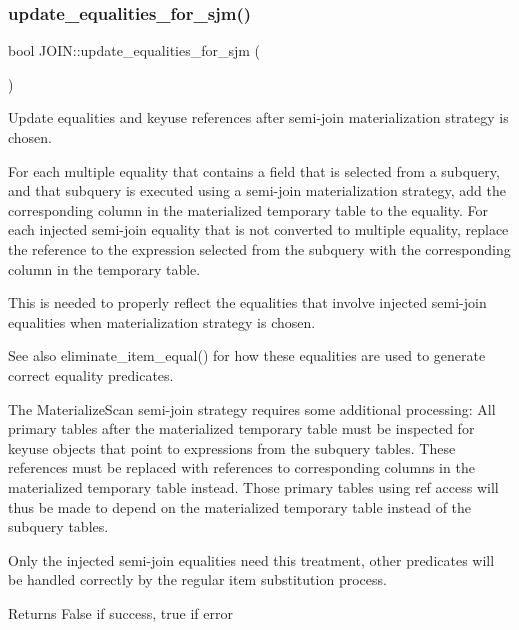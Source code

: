 \subsubsection{\texorpdfstring{update\+\_\+equalities\+\_\+for\+\_\+sjm()}{update\_equalities\_for\_sjm()}}
{\footnotesize\ttfamily bool J\+O\+I\+N\+::update\+\_\+equalities\+\_\+for\+\_\+sjm (\begin{DoxyParamCaption}{ }\end{DoxyParamCaption})}

Update equalities and keyuse references after semi-\/join materialization strategy is chosen.

For each multiple equality that contains a field that is selected from a subquery, and that subquery is executed using a semi-\/join materialization strategy, add the corresponding column in the materialized temporary table to the equality. For each injected semi-\/join equality that is not converted to multiple equality, replace the reference to the expression selected from the subquery with the corresponding column in the temporary table.

This is needed to properly reflect the equalities that involve injected semi-\/join equalities when materialization strategy is chosen. \begin{DoxySeeAlso}{See also}
eliminate\+\_\+item\+\_\+equal() for how these equalities are used to generate correct equality predicates.
\end{DoxySeeAlso}
The Materialize\+Scan semi-\/join strategy requires some additional processing\+: All primary tables after the materialized temporary table must be inspected for keyuse objects that point to expressions from the subquery tables. These references must be replaced with references to corresponding columns in the materialized temporary table instead. Those primary tables using ref access will thus be made to depend on the materialized temporary table instead of the subquery tables.

Only the injected semi-\/join equalities need this treatment, other predicates will be handled correctly by the regular item substitution process.

\begin{DoxyReturn}{Returns}
False if success, true if error 
\end{DoxyReturn}
\mbox{\label{group__Query__Optimizer_ga652bf7109dfbe0fdd7deb75c05c0a7a3}} 
